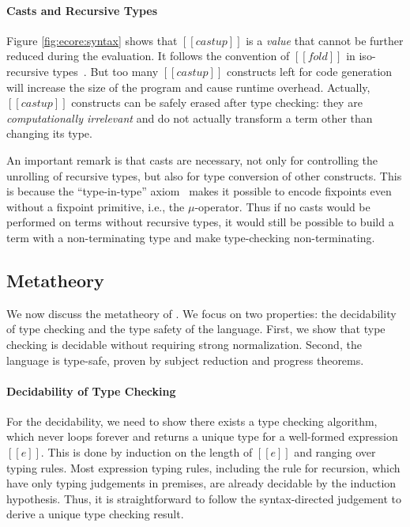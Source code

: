 \paragraph{Casts and Recursive Types}
Figure \ref{fig:ecore:syntax} shows that $[[castup]]$ is a \emph{value} that cannot be further reduced 
during the evaluation. It follows the convention of $[[fold]]$ in iso-recursive types~\cite{Vanderwaart:2003ik}.
But too many $[[castup]]$ constructs left for code generation will
increase the size of the program and cause runtime overhead.
Actually, $[[castup]]$ constructs can be safely erased after type checking:
they are \emph{computationally irrelevant} and do not actually 
transform a term other than changing its type.


An important remark is that casts are necessary, not only for controlling the unrolling of recursive types,
but also for type conversion of other constructs. 
This is because the ``type-in-type'' axiom~\cite{typeintype} makes it possible
to encode fixpoints even without a fixpoint primitive, i.e., the $\mu$-operator.
Thus if no casts would be performed on terms without recursive types,
it would still be possible to build a term with a non-terminating type and
make type-checking non-terminating.

\subsection{Metatheory}\label{sec:ecore:meta}
We now discuss the metatheory of \name. We focus on two properties:
the decidability of type checking and the type safety of the
language. First, we show that type checking \name is decidable
without requiring strong normalization. Second, the language is type-safe, 
proven by subject reduction and progress theorems.

\paragraph{Decidability of Type Checking}
For the decidability, we need to show there exists a type checking
algorithm, which never loops forever and returns a unique type for a
well-formed expression $[[e]]$. This is done by induction on the
length of $[[e]]$ and ranging over typing rules. Most expression
typing rules, including the rule  for recursion, 
which have only typing judgements in premises, are
already decidable by the induction hypothesis. Thus, it is
straightforward to follow the syntax-directed judgement to derive a
unique type checking result.

